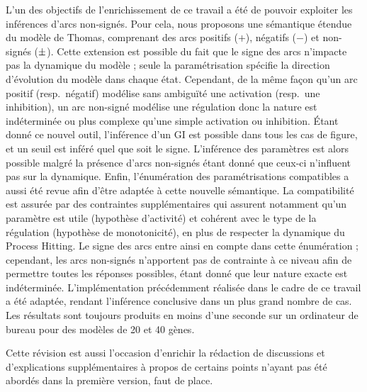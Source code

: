 L'un des objectifs de l'enrichissement de ce travail a été de pouvoir exploiter les inférences d'arcs non-signés.
Pour cela, nous proposons une sémantique étendue du modèle de Thomas, comprenant des arcs positifs ($+$), négatifs ($-$) et non-signés ($\pm$).
Cette extension est possible du fait que le signe des arcs n'impacte pas la dynamique du modèle ; seule la paramétrisation spécifie la direction d'évolution du modèle dans chaque état.
Cependant, de la même façon qu'un arc positif (resp.~négatif) modélise sans ambiguïté une activation (resp.~une inhibition),
un arc non-signé modélise une régulation donc la nature est indéterminée ou plus complexe qu'une simple activation ou inhibition.
Étant donné ce nouvel outil, l'inférence d'un GI est possible dans tous les cas de figure, et un seuil est inféré quel que soit le signe.
L'inférence des paramètres est alors possible malgré la présence d'arcs non-signés étant donné que ceux-ci n'influent pas sur la dynamique.
Enfin, l'énumération des paramétrisations compatibles a aussi été revue afin d'être adaptée à cette nouvelle sémantique.
La compatibilité est assurée par des contraintes supplémentaires qui assurent notamment qu'un paramètre est utile (hypothèse d'activité) et cohérent avec le type de la régulation (hypothèse de monotonicité), en plus de respecter la dynamique du Process Hitting.
Le signe des arcs entre ainsi en compte dans cette énumération ;
cependant, les arcs non-signés n'apportent pas de contrainte à ce niveau afin de permettre toutes les réponses possibles, étant donné que leur nature exacte est indéterminée.
L'implémentation précédemment réalisée dans le cadre de ce travail a été adaptée, rendant l'inférence conclusive dans un plus grand nombre de cas.
Les résultats sont toujours produits en moins d'une seconde sur un ordinateur de bureau pour des modèles de 20 et 40 gènes.

Cette révision est aussi l'occasion d'enrichir la rédaction de discussions et d'explications supplémentaires à propos de certains points n'ayant pas été abordés dans la première version, faut de place.
